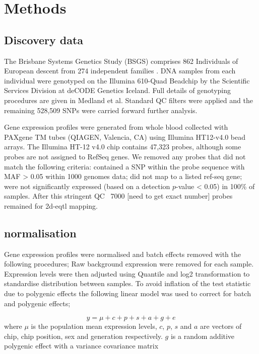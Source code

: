 \documentclass[paper=a4, fontsize=11pt]{scrartcl}	%
\numberwithin{equation}{section}									%
\numberwithin{figure}{section}										%
\numberwithin{table}{section}										%
\begin{document}

\section{Methods}

\subsection{Discovery data}

The Brisbane Systems Genetics Study (BSGS) comprises 862 Individuals of European descent from 274 independent families \citep{pmid22563384}. DNA samples from each individual were genotyped on the Illumina 610-Quad Beadchip by the Scientific Services Division at deCODE Genetics Iceland. Full details of genotyping procedures are given in Medland et al. \citep{Medland2009} Standard QC filters were applied and the remaining 528,509 SNPs were carried forward further analysis. 

Gene expression profiles were generated from whole blood collected with PAXgene TM tubes (QIAGEN, Valencia, CA) using Illumina HT12-v4.0 bead arrays. The Illumina HT-12 v4.0 chip contains 47,323 probes, although some probes are not assigned to RefSeq genes. We removed any probes that did not match the following criteria: contained a SNP within the probe sequence with MAF > 0.05 within 1000 genomes data; did not map to a listed ref-seq gene; were not significantly expressed (based on a detection $p$-value < 0.05) in 100\% of samples. After this stringent QC ~7000 [need to get exact number] probes remained for 2d-eqtl mapping. 

\subsection{normalisation}

Gene expression profiles were normalised and batch effects removed with the following procedures; Raw background expression were removed for each sample. Expression levels were then adjusted using Quantile and log2 transformation to standardise distribution between samples. To avoid inflation of the test statistic due to polygenic effects the following linear model was used to correct for batch and polygenic effects;  

\begin{equation}
y = \mu + c + p + s + a + g + e
\label{eq:lm}
\end{equation}
where $\mu$ is the population mean expression levels, $c$, $p$, $s$ and $a$ are vectors of chip, chip position, sex and generation respectively. $g$ is a random additive polygenic effect with a variance covariance matrix 
\end{document}
